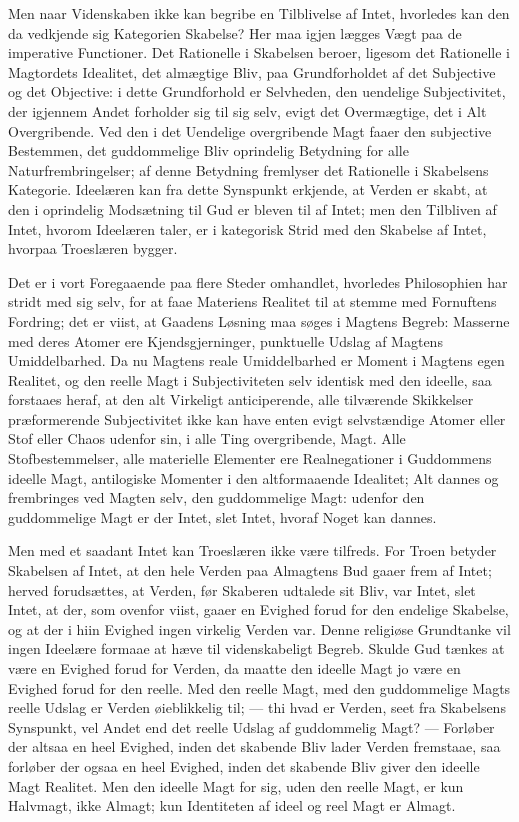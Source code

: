 \documentclass[12pt]{book}
\newcommand{\opage}[1]{\marginnote{\footnotesize\textit{[#1]}}}
\begin{document}
Men naar Videnskaben ikke kan begribe en Tilblivelse af
Intet, hvorledes kan den da vedkjende sig Kategorien Skabelse?
Her maa igjen lægges Vægt paa de imperative Functioner.
Det Rationelle i Skabelsen beroer, ligesom det Rationelle i
Magtordets Idealitet, det almægtige Bliv, paa Grundforholdet
af det Subjective og det Objective: i dette Grundforhold
er Selvheden, den uendelige Subjectivitet, der igjennem
Andet forholder sig til sig selv, evigt det Overmægtige, det i
Alt Overgribende. Ved den i det Uendelige overgribende
Magt faaer den subjective Bestemmen, det guddommelige Bliv
oprindelig Betydning for alle Naturfrembringelser; af denne
Betydning fremlyser det Rationelle i Skabelsens Kategorie.
Ideelæren kan fra dette Synspunkt erkjende, at Verden er
skabt, at den i oprindelig Modsætning til Gud er bleven til
af Intet; men den Tilbliven af Intet, hvorom Ideelæren
taler, er i kategorisk Strid med den Skabelse af Intet, hvorpaa
Troeslæren bygger.

Det er i vort Foregaaende paa flere Steder omhandlet,
hvorledes Philosophien har stridt med sig selv, for at faae
Materiens Realitet til at stemme med Fornuftens Fordring;
\opage{156}det er viist, at Gaadens Løsning maa søges i Magtens Begreb:
Masserne med deres Atomer ere Kjendsgjerninger,
punktuelle Udslag af Magtens Umiddelbarhed. Da nu %
Magtens reale Umiddelbarhed er Moment i Magtens egen
Realitet, og den reelle Magt i Subjectiviteten selv identisk med
den ideelle, saa forstaaes heraf, at den alt Virkeligt anticiperende,
alle tilværende Skikkelser præformerende Subjectivitet
ikke kan have enten evigt selvstændige Atomer eller Stof eller
Chaos udenfor sin, i alle Ting overgribende, Magt. Alle
Stofbestemmelser, alle materielle Elementer ere Realnegationer
i Guddommens ideelle Magt, antilogiske Momenter i den altformaaende
Idealitet; Alt dannes og frembringes ved Magten
selv, den guddommelige Magt: udenfor den guddommelige
Magt er der Intet, slet Intet, hvoraf Noget kan dannes.

Men med et saadant Intet kan Troeslæren ikke være
tilfreds. For Troen betyder Skabelsen af Intet, at den hele
Verden paa Almagtens Bud gaaer frem af Intet; herved forudsættes,
at Verden, før Skaberen udtalede sit Bliv, var
Intet, slet Intet, at der, som ovenfor viist, gaaer en Evighed
forud for den endelige Skabelse, og at der i hiin Evighed
ingen virkelig Verden var. Denne religiøse Grundtanke vil
ingen Ideelære formaae at hæve til videnskabeligt Begreb.
Skulde Gud tænkes at være en Evighed forud for Verden,
da maatte den ideelle Magt jo være en Evighed forud for den
reelle. Med den reelle Magt, med den guddommelige Magts
reelle Udslag er Verden øieblikkelig til; --- thi hvad er Verden,
seet fra Skabelsens Synspunkt, vel Andet end det reelle Udslag
af guddommelig Magt? --- Forløber der altsaa en heel
Evighed, inden det skabende Bliv lader Verden fremstaae, saa
forløber der ogsaa en heel Evighed, inden det skabende Bliv
giver den ideelle Magt Realitet. Men den ideelle Magt for
sig, uden den reelle Magt, er kun Halvmagt, ikke Almagt; kun
Identiteten af ideel og reel Magt er Almagt.
\end{document}
